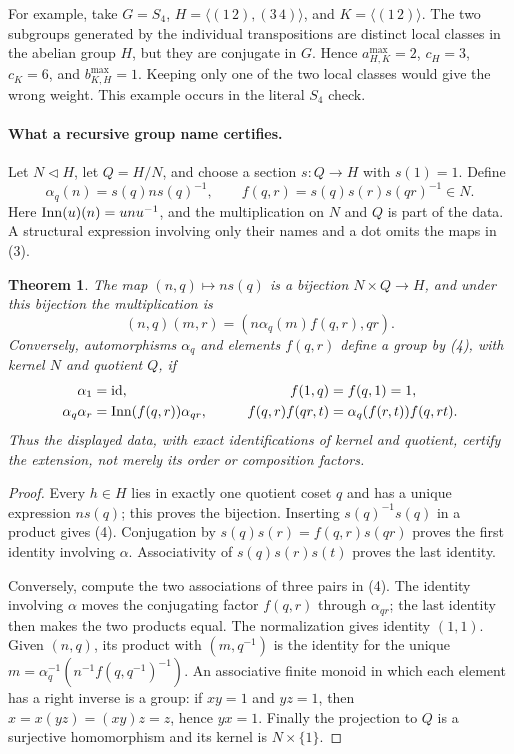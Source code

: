 \documentclass[11pt]{article}
\newtheorem{theorem}{Theorem}\newtheorem{lemma}[theorem]{Lemma}
\begin{document}
For example, take $G=S_4$, $H=\langle(1\,2),(3\,4)\rangle$, and
$K=\langle(1\,2)\rangle$. The two subgroups generated by the individual
transpositions are distinct local classes in the abelian group $H$, but
they are conjugate in $G$. Hence $a^{\max}_{H,K}=2$, $c_H=3$, $c_K=6$,
and $b^{\max}_{K,H}=1$. Keeping only one of the two local classes would
give the wrong weight. This example occurs in the literal $S_4$ check.

\paragraph{What a recursive group name certifies.}
Let $N\lhd H$, let $Q=H/N$, and choose a section $s:Q\to H$ with
$s(1)=1$. Define
\[
 \alpha_q(n)=s(q)ns(q)^{-1},\qquad
 f(q,r)=s(q)s(r)s(qr)^{-1}\in N.                         \tag{3}
\]
Here $\operatorname{Inn}(u)(n)=unu^{-1}$, and the multiplication on $N$ and $Q$ is part
of the data. A structural
expression involving only their names and a dot omits the maps in (3).

\begin{theorem}\label{extension}
The map $(n,q)\mapsto ns(q)$ is a bijection $N\times Q\to H$, and under
this bijection the multiplication is
\[
 (n,q)(m,r)=(n\alpha_q(m)f(q,r),qr).                     \tag{4}
\]
Conversely, automorphisms $\alpha_q$ and elements $f(q,r)$ define a group
by (4), with kernel $N$ and quotient $Q$, if
\begin{align*}
 \alpha_1&=\mathrm{id},&f(1,q)&=f(q,1)=1,\\
 \alpha_q\alpha_r&=\operatorname{Inn}(f(q,r))\alpha_{qr},\qquad&
 f(q,r)f(qr,t)&=\alpha_q(f(r,t))f(q,rt).
\end{align*}
Thus the displayed data, with exact identifications of kernel and quotient,
certify the extension, not merely its order or composition factors.
\end{theorem}
\begin{proof}
Every $h\in H$ lies in exactly one quotient coset $q$ and has a unique
expression $ns(q)$; this proves the bijection. Inserting $s(q)^{-1}s(q)$
in a product gives (4). Conjugation by $s(q)s(r)=f(q,r)s(qr)$ proves the
first identity involving $\alpha$. Associativity of $s(q)s(r)s(t)$ proves
the last identity.

Conversely, compute the two associations of three pairs in (4). The
identity involving $\alpha$ moves the conjugating factor $f(q,r)$ through
$\alpha_{qr}$; the last identity then makes the two products equal.
The normalization gives identity $(1,1)$. Given $(n,q)$, its product with
$(m,q^{-1})$ is the identity for the unique
$m=\alpha_q^{-1}(n^{-1}f(q,q^{-1})^{-1})$. An associative finite monoid
in which each element has a right inverse is a group: if $xy=1$ and
$yz=1$, then $x=x(yz)=(xy)z=z$, hence $yx=1$. Finally the projection to
$Q$ is a surjective homomorphism and its kernel is $N\times\{1\}$.
\end{proof}
\end{document}
